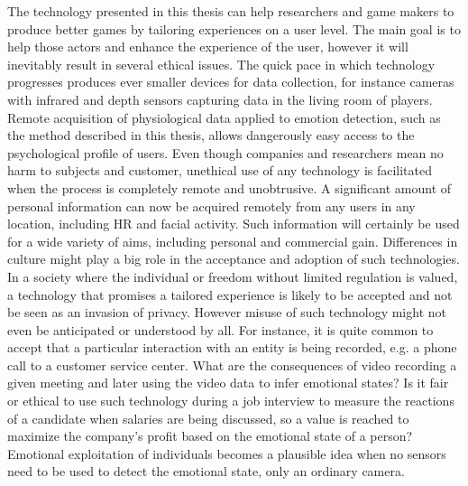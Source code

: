 The technology presented in this thesis can help researchers and game makers to produce better games by tailoring experiences on a user level. The main goal is to help those actors and enhance the experience of the user, however it will inevitably result in several ethical issues. The quick pace in which technology progresses produces ever smaller devices for data collection, for instance cameras with infrared and depth sensors capturing data in the living room of players. Remote acquisition of physiological data applied to emotion detection, such as the method described in this thesis, allows dangerously easy access to the psychological profile of users. Even though companies and researchers mean no harm to subjects and customer, unethical use of any technology is facilitated when the process is completely remote and unobtrusive. A significant amount of personal information can now be acquired remotely from any users in any location, including HR and facial activity. Such information will certainly be used for a wide variety of aims, including personal and commercial gain. Differences in culture might play a big role in the acceptance and adoption of such technologies. In a society where the individual or freedom without limited regulation is valued, a technology that promises a tailored experience is likely to be accepted and not be seen as an invasion of privacy. However misuse of such technology might not even be anticipated or understood by all. For instance, it is quite common to accept that a particular interaction with an entity is being recorded, e.g. a phone call to a customer service center. What are the consequences of video recording a given meeting and later using the video data to infer emotional states? Is it fair or ethical to use such technology during a job interview to measure the reactions of a candidate when salaries are being discussed, so a value is reached to maximize the company's profit based on the emotional state of a person? Emotional exploitation of individuals becomes a plausible idea when no sensors need to be used to detect the emotional state, only an ordinary camera.

